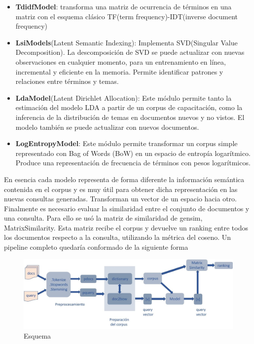 \documentclass{llncs}
\begin{document}
\begin{itemize}
	\item \textbf{TdidfModel}: transforma una matriz de ocurrencia de términos en una matriz con el esquema clásico TF(term frequency)-IDT(inverse document frequency)
	\item \textbf{LsiModels}(Latent Semantic Indexing): Implementa SVD(Singular Value Decomposition). La descomposición de SVD se puede actualizar con nuevas observaciones en cualquier momento, para un entrenamiento en línea, incremental y eficiente en la memoria. Permite identificar patrones y relaciones entre términos y temas. 
	\item \textbf{LdaModel}(Latent Dirichlet Allocation): Este módulo permite tanto la estimación del modelo LDA a partir de un corpus de capacitación, como la inferencia de la distribución de temas en documentos nuevos y no vistos. El modelo también se puede actualizar con nuevos documentos.
	\item \textbf{LogEntropyModel}: Este módulo permite transformar un corpus simple representado con Bag of Words (BoW) en un espacio de entropía logarítmico. Produce una representación de frecuencia de términos con pesos logarítmicos.
	
\end{itemize}

	En esencia cada modelo representa de forma diferente la información semántica contenida en el corpus y es muy útil para obtener dicha representación en las nuevas consultas generadas. Transforman un vector de un espacio hacia otro.
Finalmente es necesario evaluar la similaridad entre el conjunto de documentos y una consulta. Para ello se usó la matriz de similaridad de gensim, MatrixSimilarity. Esta matriz recibe el corpus y devuelve un ranking entre todos los documentos respecto a la consulta, utilizando la métrica del coseno.
Un pipeline completo quedaría conformado de la siguiente forma

\begin{figure}
	\begin{center}
		\includegraphics[width=\linewidth]{ ./images/vect.jpg}
		\caption{Esquema}
		\label{vect}
	\end{center}
\end{figure}
\end{document}
